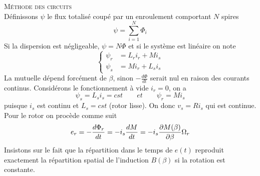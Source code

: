 		\textsc{Méthode des circuits}\\
		Définissons $\psi$ le flux totalisé coupé par un enroulement comportant $N$ spires
		\begin{equation}
		\psi = \sum _{i=1} ^N \Phi _i
		\end{equation}
		Si la dispersion est négligeable, $\psi = N\Phi$ et si le système est linéaire on note 
		\begin{equation}
		\left\{
		\begin{aligned}
		\psi _r &= L_ri_r + Mi_s\\
		\psi _s &= Mi_r + L_si_s
		\end{aligned}
		\right.
		\end{equation}
		La mutuelle dépend forcément de $\beta$, sinon $-\frac{d\Phi}{dt}$ serait nul en raison des courants continus. Considérons le fonctionnement à vide $i_r=0$, on a 
		\begin{equation}
			\psi _s = L_s i_s = cst \qquad et \qquad \psi _r = Mi_s
		\end{equation}
		puisque $i_s$ est continu et $L_s=cst$ (rotor lisse). On donc $v_s = Ri_s$ qui est continue. Pour le rotor on procède comme suit 
		\begin{equation}
			\begin{aligned}
				e_r = -\frac{d\Phi _r}{dt} = -i_s \frac{dM}{dt} = -i_s \frac{\D M(\beta )}{\D \beta} \Omega _r
			\end{aligned}
		\end{equation}		 
		Insistons sur le fait que la répartition dans le temps de $e(t)$ reproduit exactement la répartition spatial de l'induction $B(\beta)$ si la rotation est constante. 
		
